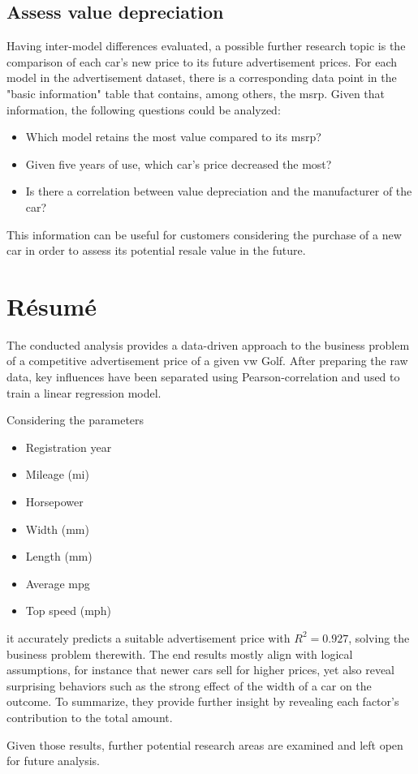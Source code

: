 \subsection{Assess value depreciation}
Having inter-model differences evaluated, a possible further research topic is the comparison of each car's new price
to its future advertisement prices. For each model in the advertisement dataset, there is a corresponding data point
in the "basic information" table that contains, among others, the \ac{msrp}. 
\newline
Given that information, the following questions could be analyzed: 
\begin{itemize}
\item Which model retains the most value compared to its \ac{msrp}?
\item Given five years of use, which car's price decreased the most?
\item Is there a correlation between value depreciation and the manufacturer of the car?
\end{itemize}
This information can be useful for customers considering the purchase of a new car in order to assess its potential resale value in the future.

\section{Résumé}

The conducted analysis provides a data-driven approach to the business problem of a competitive advertisement price of a given \ac{vw} Golf.
After preparing the raw data, key influences have been separated using Pearson-correlation and used to train a linear regression model.
\par
Considering the parameters 
\begin{itemize}
    \item Registration year
    \item Mileage (mi)
    \item Horsepower
    \item Width (mm)
    \item Length (mm)
    \item Average mpg
    \item Top speed (mph)
\end{itemize}
it accurately predicts a suitable advertisement price with $R^2 = 0.927$, solving the business problem therewith.
The end results mostly align with logical assumptions, for instance that newer cars sell for higher prices, yet also reveal
surprising behaviors such as the strong effect of the width of a car on the outcome.
To summarize, they provide further insight by revealing each factor's contribution to the total amount.
\par
Given those results, further potential research areas are examined and left open for future analysis. 


